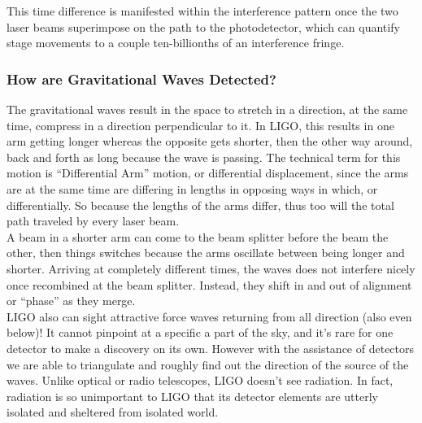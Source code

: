 This time difference is manifested within the interference pattern once the two laser beams superimpose on the path to the photodetector, which can quantify stage movements to a couple ten-billionths of an interference fringe\cite{barish1999ligo}.\\

\subsubsection{How are Gravitational Waves Detected?}
The gravitational waves result in the space to stretch in a direction, at the same time,  compress in a direction perpendicular to it. In LIGO, this results in one arm getting longer whereas the opposite gets shorter, then the other way around, back and forth as long because the wave is passing.  The technical term for this motion is “Differential Arm” motion, or differential displacement, since the arms are at the same time are differing in lengths in opposing ways in which, or differentially. So because the lengths of the arms differ, thus too will the total path traveled by every laser beam. \\
A beam in a shorter arm can come to the beam splitter before the beam the other, then things switches because the arms oscillate between being longer and shorter. Arriving at completely different times, the waves does not interfere nicely once recombined at the beam splitter.  Instead, they shift in and out of alignment or “phase” as they merge.\\
LIGO also can sight attractive force waves returning from all direction (also even below)!  It cannot pinpoint at a specific a part of the sky, and it's rare for one detector to make a discovery on its own. However with the assistance of detectors we are able to triangulate and roughly find out the direction of the source of the waves. Unlike optical or radio telescopes, LIGO doesn't see radiation. In fact, radiation is so unimportant to LIGO that its detector elements are utterly isolated and sheltered from isolated world. 



